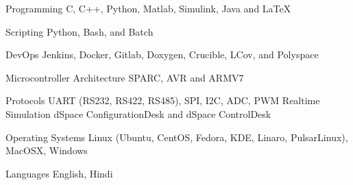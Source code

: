

\begin{cvskills}

  \cvskill
    {Programming} %
    {C, C++, Python, Matlab, Simulink, Java and LaTeX} %

%
  \cvskill
    {Scripting} %
    {Python, Bash, and Batch} %

%
  \cvskill
    {DevOps} %
    {Jenkins, Docker, Gitlab, Doxygen, Crucible, LCov, and Polyspace} %

  \cvskill
    {Microcontroller Architecture} %
    {SPARC, AVR and ARMV7} %

  \cvskill
    {Protocols} %
	{UART (RS232, RS422, RS485), SPI, I2C, ADC, PWM} %
  \cvskill
    {Realtime Simulation} %
    {dSpace ConfigurationDesk and dSpace ControlDesk} %

  \cvskill
    {Operating Systems} %
    {Linux (Ubuntu, CentOS, Fedora, KDE, Linaro, PulsarLinux), MacOSX, Windows} %

  \cvskill
    {Languages} %
    {English, Hindi} %

\end{cvskills}
